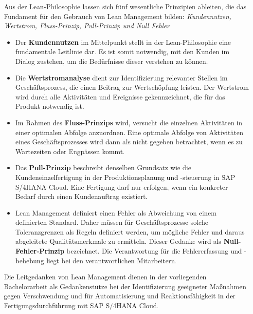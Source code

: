 \newpage

Aus der Lean-Philosophie lassen sich fünf wesentliche Prinzipien ableiten, die das Fundament für den Gebrauch von Lean Management bilden: \textit{Kundennutzen, Wertstrom, Fluss-Prinzip, Pull-Prinzip und Null Fehler}\begin{itemize}
    \item 
    Der \textbf{Kundennutzen} im Mittelpunkt stellt in der Lean-Philosophie eine fundamentale Leitlinie dar. 
    Es ist somit notwendig, mit den Kunden im Dialog zustehen, um die Bedürfnisse dieser verstehen zu können.
    \cite{Muller.2011} 
    \item
    Die \textbf{Wertstromanalyse} dient zur Identifizierung relevanter Stellen im Geschäftsprozess, die einen Beitrag zur Wertschöpfung leisten. Der Wertstrom wird durch alle Aktivitäten und Ereignisse gekennzeichnet, die für das Produkt notwendig ist. 
    \item
    Im Rahmen des \textbf{Fluss-Prinzips} wird, versucht die einzelnen Aktivitäten in einer optimalen Abfolge anzuordnen. Eine optimale Abfolge von Aktivitäten eines Geschäftsprozesses wird dann als nicht gegeben betrachtet, wenn es zu Wartezeiten oder Engpässen kommt.
    \item
    Das \textbf{Pull-Prinzip} beschreibt denselben Grundsatz wie die Kundeneinzelfertigung in der Produktionsplanung und -steuerung in SAP S/4HANA Cloud. Eine Fertigung darf nur erfolgen, wenn ein konkreter Bedarf durch einen Kundenauftrag existiert.
    \item
    Lean Management definiert einen Fehler als Abweichung von einem definierten Standard. Daher müssen für Geschäftsprozesse solche Toleranzgrenzen als Regeln definiert werden, um mögliche Fehler und daraus abgeleitete Qualitätsmerkmale zu ermitteln. Dieser Gedanke wird als \textbf{Null-Fehler-Prinzip} bezeichnet.
    Die Verantwortung für die Fehlererfassung und -behebung liegt bei den verantwortlichen Mitarbeitern.
\end{itemize}

Die Leitgedanken von Lean Management dienen in der vorliegenden Bachelorarbeit als Gedankenstütze bei der Identifizierung geeigneter Maßnahmen gegen Verschwendung und für Automatisierung und Reaktionsfähigkeit in der Fertigungsdurchführung mit SAP S/4HANA Cloud.